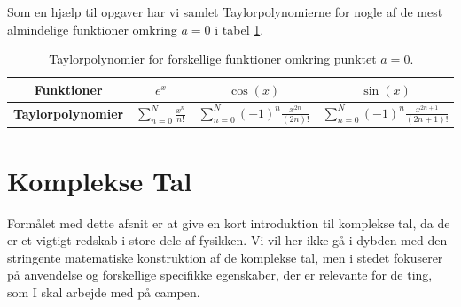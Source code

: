 Som en hjælp til opgaver har vi samlet Taylorpolynomierne for nogle af de mest almindelige funktioner omkring $a = 0$ i tabel \ref{Taylorseries_table}.
\begin{table}[h!]
	\centering
	\caption{Taylorpolynomier for forskellige funktioner omkring punktet $a=0$.}
	\label{Taylorseries_table}
	\bgroup
	\def\arraystretch{2}
	\begin{tabular}{|c|c|c|c|}
		\hline
		\textbf{Funktioner}   & $e^x$ & $\cos(x)$ & $\sin(x)$  \\ 
		\hline
		\textbf{Taylorpolynomier} & $\sum\limits_{n = 0}^{N} \frac{x^n}{n!}$ & $\sum\limits_{n=0}^{N} (-1)^n \frac{x^{2n}}{(2n)!} $ & $\sum\limits_{n=0}^{N} (-1)^n \frac{x^{2n+1}}{(2n+1)!}$  \\ \hline
	\end{tabular}
	\egroup
\end{table}

\section{Komplekse Tal}

Formålet med dette afsnit er at give en kort introduktion til komplekse tal, da de er et vigtigt redskab i store dele af fysikken. Vi vil her ikke gå i dybden med den stringente matematiske konstruktion af de komplekse tal, men i stedet fokuserer på anvendelse og forskellige specifikke egenskaber, der er relevante for de ting, som I skal arbejde med på campen.\\

